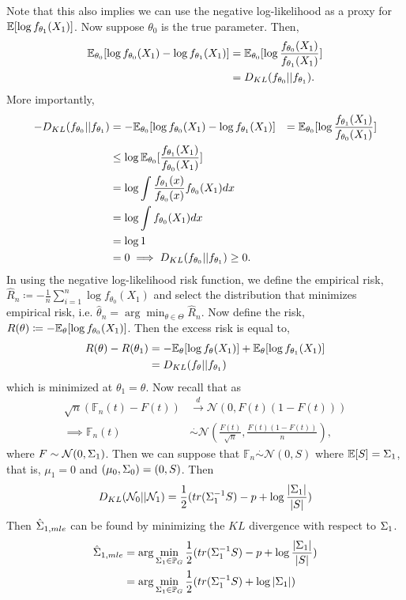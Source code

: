 \documentclass[12pt, leqno]{article}
\providecommand{\abs}[1]{\lvert#1\rvert}
\let\oldhat\hat
\renewcommand{\hat}[1]{\oldhat{{#1}}}
\def\s{\ensuremath\Sigma}
\def\pg{\ensuremath\mathbb{P}_{{G}}}
\def\E{\ensuremath\mathbb{E}}
\begin{document}
Note that this also implies we can use the negative
log-likelihood as a proxy for $\E[\log{{f_{\theta_1}(X_1)}}]$. Now
suppose $\theta_0$ is the true parameter. Then,
\begin{align*}
\E_{\theta_0}[\log{{f_{\theta_0}(X_1)}} - \log{{f_{\theta_1}(X_1)}}]
  &= \E_{\theta_0}[\log
    \frac{{{f_{\theta_0}(X_1)}}}{{{f_{\theta_1}(X_1)}}}] \\
&= D_{KL}(f_{\theta_0}||f_{\theta_1}).
\end{align*}
More importantly, 
\begin{align*}
- D_{KL}(f_{\theta_0}||f_{\theta_1}) &= -\E_{\theta_0}[\log{{f_{\theta_0}(X_1)}} - \log{{f_{\theta_1}(X_1)}}]
  &= \E_{\theta_0}[\log
    \frac{{{f_{\theta_1}(X_1)}}}{{{f_{\theta_0}(X_1)}}}] \\
& \leq \log \E_{\theta_0}[
    \frac{{{f_{\theta_1}(X_1)}}}{{{f_{\theta_0}(X_1)}}}] \\
& = \log \int
    \frac{{{f_{\theta_1}(x)}}}{{{f_{\theta_0}(x)}}}
  f_{\theta_0}(X_1) dx  \\
&=\log \int
  f_{\theta_0}(X_1) dx \\
&= \log 1 \\
&=0
\implies D_{KL}(f_{\theta_0}||f_{\theta_1}) \geq 0.
\end{align*}
In using the negative log-likelihood risk function, we define the
empirical risk, $\hat{R}_n \coloneqq -\frac{1}{n} \sum_{i=1}^n 
\log{{f_{\theta_0}(X_1)}}$ and select the distribution that minimizes
empirical risk, i.e. $\hat{\theta}_n = \arg \min_{\theta \in \Theta} \hat{R}_n$.
Now define the risk, $R(\theta) \coloneqq
-\E_{\theta}[\log{{f_{\theta_0}(X_1)}}]$. Then the excess risk is
equal to,
\begin{align*}
R(\theta) - R(\theta_1) &=
-\E_{\theta}[\log{{f_{\theta}(X_1)}}] +
                          \E_{\theta}[\log{{f_{\theta_1}(X_1)}}] \\
&= D_{KL}(f_{\theta}||f_{\theta_1}) 
\end{align*}
which is minimized at $\theta_1 = \theta$.
Now recall that as 
\begin{align*}
\sqrt{n} (\mathbb{F}_n(t) - F(t)) &\overset{d}{\to}
                                    \mathcal{N}(0,F(t)(1-F(t))) \\
\implies \mathbb{F}_n(t) &\overset{.}{\sim} \mathcal{N}(\frac{F(t)}{\sqrt{n} },\frac{F(t)(1-F(t))}{n}),
\end{align*}
where $F \sim \mathcal{N}(0,\s_1)$. Then we can suppose that
$\mathbb{F}_n \overset{.}{\sim} \mathcal{N}(0,S)$ where $\E[S] =
\s_1$, that is, $\mu_1 = 0$ and 
$(\mu_0,\s_0) = (0,S)$. Then
\[
D_{KL}(\mathcal{N}_0||\mathcal{N}_1) = \frac{1}{2}(tr(\s_1^{-1}
S) -p + \log \frac{\abs{\s_1}}{\abs{S}})
\]
Then $\hat{\s}_{1,mle}$ can be found by minimizing the $KL$ divergence with
respect to ${\s_1}$.
\begin{align*}
\hat{\s}_{1,mle}&= \arg\min_{\s_1 \in \pg} \frac{1}{2}(tr( \s_1^{-1} S
) -p + \log \frac{\abs{\s_1}}{\abs{S}}) \\
&= \arg\min_{\s_1 \in \pg} \frac{1}{2}(tr( \s_1^{-1} S
) + \log {\abs{\s_1}}) 
\end{align*}
\end{document}
